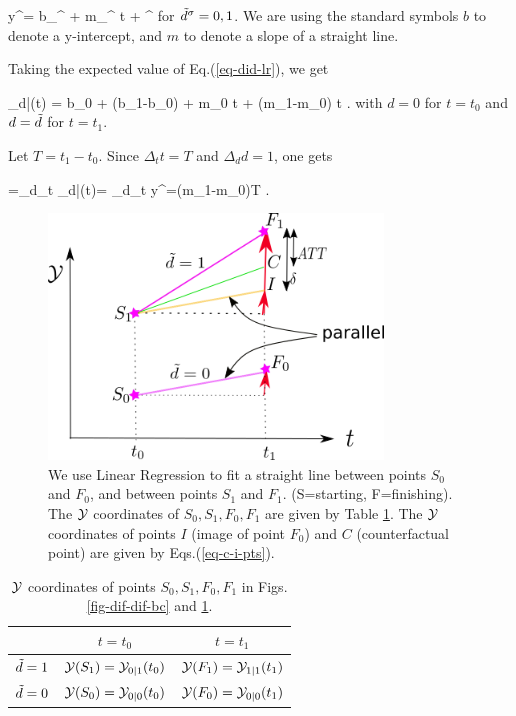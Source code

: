 \beq
y^\s = b_{\td^\s} + m_{\td^\s} t + \eps^\s
\eeq
for ${\tilde{d}}^\sigma=0,1$. 
We are
using the
standard symbols
$b$ to denote
a y-intercept, and $m$ 
to denote a slope
of a straight line.

Taking the expected value
of Eq.(\ref{eq-did-lr}), we get

\beq
\caly_{d|\td}(t) = b_0 + (b_1-b_0) \td + m_0 t + 
(m_1-m_0)
t \td
\;.
\eeq  
with $d=0$ for $t=t_0$
and $d={\tilde{d}}$ for $t=t_1$.

Let $T=t_1-t_0$. Since
$\Delta_t t=T$ and $\Delta_d d=1$, one gets

\beq
\delta=\Delta_d\Delta_t \calm\caly_{d|\td}(t)=
\Delta_d\Delta_t y^\s=(m_1-m_0)T
\;.
\eeq



\begin{figure}[h!]
\centering
\includegraphics[width=3.5in]
{did/parallel-trends.png}
\caption{We use
Linear Regression
to fit a straight line
between points $S_0$
and $F_0$,
and between points
$S_1$ and $F_1$.
(S=starting, F=finishing).
The ${\cal Y}$
coordinates
of $S_0, S_1, F_0, F_1$
are given by Table \ref{tab-did-points}.
The ${\cal Y}$
coordinates of points
$I$ (image of point $F_0$)
and $C$ (counterfactual point)
are 
given by Eqs.(\ref{eq-c-i-pts}).
} 
\label{fig-parallel-trends}
\end{figure}

\begin{table}[h!]
\centering
{\renewcommand{\arraystretch}{1.2}
\begin{tabular}{|c|c|c|}
\hline 
\rowcolor[HTML]{ECF4FF} 
 & $t=t_0$ & $t=t_1$ \\ 
\hline
${\tilde{d}}=1$ \cellcolor[HTML]{ECF4FF}& ${\cal Y}(S_1)={\cal Y}_{0|1}(t_0)$ & ${\cal Y}(F_1)={\cal Y}_{1|1}(t_1)$ \\ 
\hline 
${\tilde{d}}=0$\cellcolor[HTML]{ECF4FF} & ${\cal Y}(S_0)={\cal Y}_{0|0}(t_0)$ & ${\cal Y}(F_0)={\cal Y}_{0|0}(t_1)$ \\ 
\hline 
\end{tabular}
}
\caption{
${\cal Y}$ coordinates
of points
$S_0, S_1, F_0, F_1$
in Figs.\ref{fig-dif-dif-bc}
 and \ref{fig-parallel-trends}.
}
\label{tab-did-points}
\end{table}



